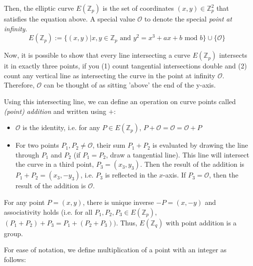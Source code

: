 Then, the elliptic curve $E(\mathbb{Z}_p)$ is the set of coordinates $(x, y) \in \mathbb{Z}_p^2$ that satisfies the equation above. 
A special value $\mathcal{O}$ to denote the special \emph{point at infinity}. \cite{katz_introduction_2015}
\begin{equation}
    E(\mathbb{Z}_p) := \{(x, y) | x,y \in \mathbb{Z}_p \text{ and } y^2 = x^3 + a x + b \text{ mod } b\} \cup \{\mathcal{O}\}
\end{equation}

Now, it is possible to show that every line intersecting a curve $E(\mathbb{Z}_p)$ intersects it in exactly three points, if you (1) count tangential intersections double and (2) count any vertical line as intersecting the curve in the point at infinity $\mathcal{O}$.
Therefore, $\mathcal{O}$ can be thought of as sitting 'above' the end of the y-axis.\cite{katz_introduction_2015}

Using this intersecting line, we can define an operation on curve points called \emph{(point) addition} and written using $+$: \cite{katz_introduction_2015}

\begin{itemize}
    \item $\mathcal{O}$ is the identity, i.e. for any $P \in E(\mathbb{Z}_p)$, $P + \mathcal{O} = \mathcal{O} = \mathcal{O} + P$ 
    \item For two points $P_1, P_2 \neq \mathcal{O}$, their sum $P_1 + P_2$ is evaluated by drawing the line through $P_1$ and $P_2$ (if $P_1 = P_2$, draw a tangential line). 
        This line will intersect the curve in a third point, $P_3 = (x_3, y_3)$.
        Then the result of the addition is $P_1 + P_2 = (x_3, -y_3)$, i.e. $P_3$ is reflected in the $x$-axis.
        If $P_3 = \mathcal{O}$, then the result of the addition is $\mathcal{O}$.
\end{itemize}

For any point $P = (x,y)$, there is unique inverse $-P = (x, -y)$ and associativity holds (i.e. for all $P_1, P_2, P_3 \in E(\mathbb{Z}_p)$, $(P_1 + P_2) + P_3 = P_1 + (P_2 + P_3))$. Thus, $E(\mathbb{Z}_q)$ with point addition is a group. \cite{katz_introduction_2015}

For ease of notation, we define multiplication of a point with an integer as follows: 

